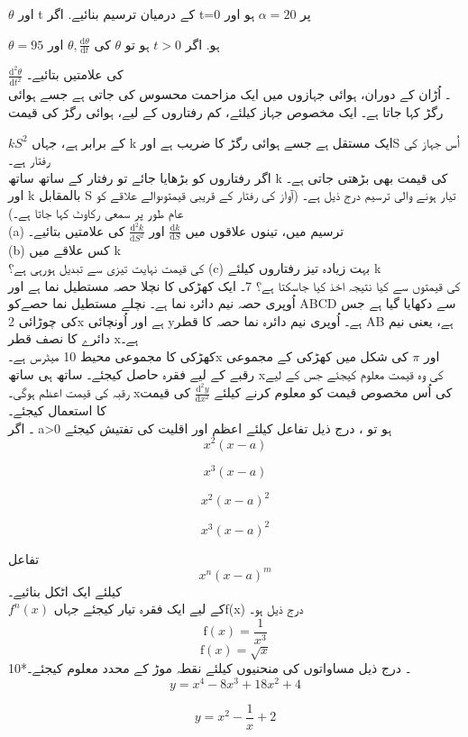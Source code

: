 \( \theta\)
اور
t
کے درمیان ترسیم بنائیے. 
اگر
t=0
  پر
  \( \alpha = 20\)
  ہو اور 

\( \theta = 95\)
ہو.
اگر
\( t > 0\)
ہو تو 
\( \theta\)
 کی 
 \( \theta, \frac{\text{d}\theta}{\text{d}t}\)
 اور 
 
\( \frac{\text{d}^2\theta}{\text{d}t^2}\)
کی علامتیں بتائیے۔ \\
۔ اُڑان کے دوران، ہوائی جہازوں میں ایک مزاحمت محسوس کی جاتی ہے جسے ہوائی رگڑ  کہا جاتا ہے۔ ایک مخصوص جہاز کیلئے، کم رفتاروں کے لیے، ہوائی رگڑ کی قیمت 

\( kS^2\)
کے برابر ہے، جہاں k  ایک مستقل ہے جسے ہوائی رگڑ کا ضریب  ہے اورS   اُس جہاز کی رفتار ہے۔ \\
اگر رفتاروں کو بڑھایا جائے تو رفتار کے ساتھ ساتھ k کی قیمت بھی بڑھتی جاتی ہے۔ اور k  بالمقابل S تیار ہونے والی ترسیم درج ذیل ہے۔ (آواز کی رفتار کے قریبی قیمتوںوالے علاقے  کو عام طور پر سمعی رکاوٹ  کہا جاتا ہے۔)\\
(a) ترسیم میں، تینوں علاقوں میں
\( \frac{\text{d}k}{\text{d}S}\)
اور
\( \frac{\text{d}^2k}{\text{d}S^2}\)
کی علامتیں بتائیے۔\\
(b) کس علاقے میں k  \\کی قیمت نہایت تیزی سے تبدیل ہورہی ہے؟
(c) بہت زیادہ تیز رفتاروں کیلئے  k \\کی قیمتوں سے کیا نتیجہ اخذ کیا جاسکتا ہے؟
7۔ ایک کھڑکی کا نچلا حصہ مستطیل نما ہے اور اُوپری حصہ نیم دائرہ نما ہے۔ نچلے مستطیل نما حصےکو ABCD سے دکھایا گیا ہے جس کی چوڑائی 2x  ہے اور اُونچائی  yہے۔ اُوپری نیم دائرہ نما حصہ کا قطر AB ہے، یعنی نیم دائرے کا نصف قطر  xہے۔ \\
	کھڑکی کا مجموعی محیط 10 میٹرس ہے۔x  اور
\(\pi\)
  کی شکل میں کھڑکی کے مجموعی رقبے کے لیے فقرہ حاصل کیجئے۔ ساتھ ہی ساتھ  xکی وہ قیمت معلوم کیجئے جس کے لیے رقبہ کی قیمت اعظم ہوگی۔  xکی اُس مخصوص قیمت کو معلوم کرنے کیلئے
 \( \frac{\text{d}^2y}{\text{d}x^2}\)
   کی قیمت کا استعمال کیجئے۔ \\
۔ اگر   a>0   ہو تو ، درج ذیل تفاعل کیلئے اعظم اور اقلیت کی تفتیش کیجئے \\

\[x^2(x-a)\]

\[x^3(x-a)\]

\[x^2(x-a)^2\]

\[x^3(x-a)^2\]


تفاعل 
\[x^n(x-a)^m\]
 کیلئے ایک اٹکل  بنائیے۔ \\
 \(f^{n}(x)\)
 کے لیے ایک فقرہ تیار کیجئے جہاںf(x)  درج ذیل ہو۔ \\
\[\text{f}(x) = \frac{1}{x^3}\]
\[\text{f}(x) = \sqrt{x}\]
10*۔ درج  ذیل مساواتوں کی منحنیوں کیلئے نقطہ موڑ کے محدد  معلوم کیجئے۔ \\

\[y = x^4 - 8x^3 + 18x^2 + 4\]

\[y = x^2 - \frac{1}{x} + 2\]

